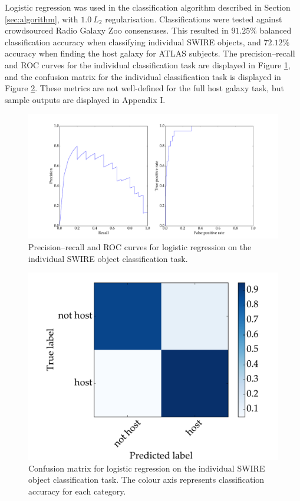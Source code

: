 \documentclass[a4paper]{article}
\newcommand{\fig}{Figure }
\newcommand{\sect}{Section }
\newcommand{\app}{Appendix }
\begin{document}
      Logistic regression was used in the classification algorithm described in \sect \ref{sec:algorithm}, with $1.0\ L_2$ regularisation. Classifications were tested against crowdsourced Radio Galaxy Zoo consensuses. This resulted in $91.25\%$ balanced classification accuracy when classifying individual SWIRE objects, and $72.12\%$ accuracy when finding the host galaxy for ATLAS subjects. The precision--recall and ROC curves for the individual classification task are displayed in \fig \ref{fig:precision-recall-roc-lr}, and the confusion matrix for the individual classification task is displayed in \fig \ref{fig:confusion-lr}. These metrics are not well-defined for the full host galaxy task, but sample outputs are displayed in \app I.

      \begin{figure}[!ht]
        \centering
        \includegraphics[width=\linewidth]{images/metrics_lr.pdf}
        \caption{Precision--recall and ROC curves for logistic regression on the individual SWIRE object classification task.}
        \label{fig:precision-recall-roc-lr}
      \end{figure}

      \begin{figure}[!ht]
        \centering
        \includegraphics[width=0.5\linewidth]{images/confusion_lr.pdf}
        \caption{Confusion matrix for logistic regression on the individual SWIRE object classification task. The colour axis represents classification accuracy for each category.}
        \label{fig:confusion-lr}
      \end{figure}
\end{document}
